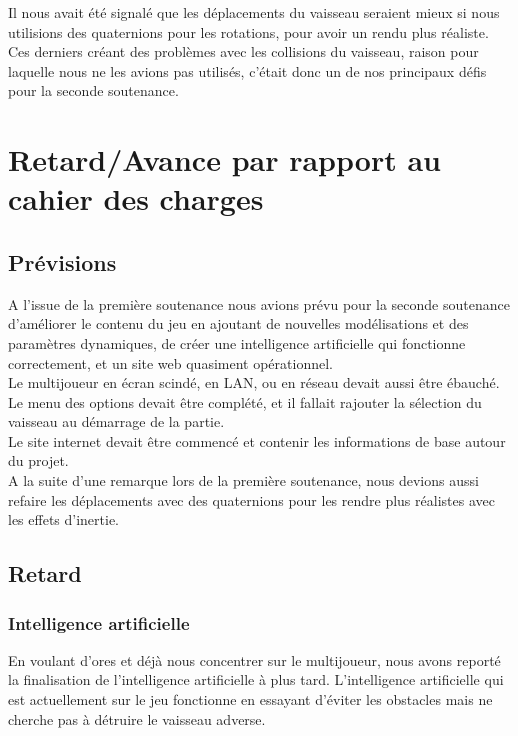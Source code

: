 \documentclass[10pt, titlepage]{report}
\begin{document}
Il nous avait été signalé que les déplacements du vaisseau seraient mieux si nous utilisions des quaternions pour les rotations, pour avoir un rendu plus réaliste. Ces derniers créant des problèmes avec les collisions du vaisseau, raison pour laquelle nous ne les avions pas utilisés, c'était donc un de nos principaux défis pour la seconde soutenance.\\


\chapter{Retard/Avance par rapport au cahier des charges}

\section{Prévisions}
A l'issue de la première soutenance nous avions prévu pour la seconde soutenance d'améliorer le contenu du jeu en ajoutant de nouvelles modélisations et des paramètres dynamiques, de créer une intelligence artificielle qui fonctionne correctement, et un site web quasiment opérationnel.\\

 Le multijoueur en écran scindé, en LAN, ou en réseau devait aussi être ébauché. Le menu des options devait être complété, et il fallait rajouter la sélection du vaisseau au démarrage de la partie.\\

Le site internet devait être commencé et contenir les informations de base autour du projet.\\

A la suite d'une remarque lors de la première soutenance, nous devions aussi refaire les déplacements avec des quaternions pour les rendre plus réalistes avec les effets d'inertie.\\

\section{Retard}

\subsection{Intelligence artificielle}
En voulant d'ores et déjà nous concentrer sur le multijoueur, nous avons reporté la finalisation de l'intelligence artificielle à plus tard. L'intelligence artificielle qui est actuellement sur le jeu fonctionne en essayant d'éviter les obstacles mais ne cherche pas à détruire le vaisseau adverse.\\
\end{document}

